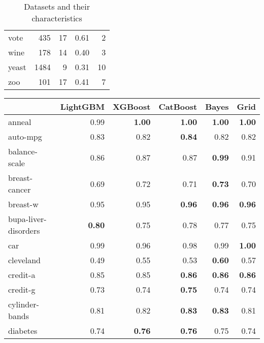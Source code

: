 \documentclass[a4paper,twoside,12pt]{book}
\begin{document}
\begin{table}[!htb]
\begin{tabular}{lrrrr}
vote                    &     435 &         17 &                                   0.61 &          2 \\
wine                    &     178 &         14 &                                   0.40 &          3 \\
yeast                   &    1484 &          9 &                                   0.31 &         10 \\
zoo                     &     101 &         17 &                                   0.41 &          7 \\
\bottomrule
\end{tabular}
\caption{Datasets and their characteristics}
\label{tab:datasety}
\end{table}

\begin{table}[!htb]
\centering
\begin{tabular}{lrrrrr}
\toprule
{} &  LightGBM &  XGBoost &  CatBoost &  Bayes &  Grid \\
\midrule
anneal                  &  0.99 &     \textbf{1.00} &      \textbf{1.00} &   \textbf{1.00} &  \textbf{1.00} \\
auto-mpg                &  0.83 &     0.82 &      \textbf{0.84} &   0.82 &  0.82 \\
balance-scale           &  0.86 &     0.87 &      0.87 &   \textbf{0.99} &  0.91 \\
breast-cancer           &  0.69 &     0.72 &      0.71 &   \textbf{0.73} &  0.70 \\
breast-w                &  0.95 &     0.95 &      \textbf{0.96} &  \textbf{ 0.96} &  \textbf{0.96} \\
bupa-liver-disorders    &  \textbf{0.80} &     0.75 &      0.78 &   0.77 &  0.75 \\
car                     &  0.99 &     0.96 &      0.98 &   0.99 &  \textbf{1.00} \\
cleveland               &  0.49 &     0.55 &      0.53 &   \textbf{0.60} &  0.57 \\
credit-a                &  0.85 &     0.85 &      \textbf{0.86} &  \textbf{ 0.86} &  \textbf{0.86} \\
credit-g                &  0.73 &     0.74 &      \textbf{0.75} &   0.74 &  0.74 \\
cylinder-bands          &  0.81 &     0.82 &      \textbf{0.83} &   \textbf{0.83} &  0.81 \\
diabetes                &  0.74 &     \textbf{0.76} &      \textbf{0.76} &   0.75 &  0.74 \\

\end{tabular}
\end{table}
\end{document}
